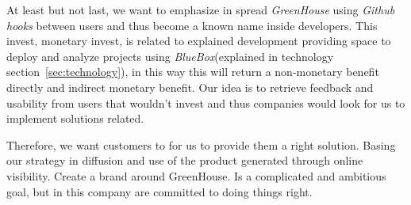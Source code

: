 \documentclass[11pt]{scrartcl}
\begin{document}
\par At least but not last, we want to emphasize in spread \emph{GreenHouse} using \emph{Github hooks} between users and thus become a known name inside developers. This invest, monetary invest, is related to explained development providing space to deploy and analyze projects using \emph{BlueBox}(explained in technology section~\ref{sec:technology}), in this way this will return a non-monetary benefit directly and indirect monetary benefit. Our idea is to retrieve feedback and usability from users that wouldn't invest and thus companies would look for us to implement solutions related.

\par Therefore, we want customers to for us to provide them a right solution. Basing our strategy in diffusion and use of the product generated through online visibility. Create a brand around GreenHouse. Is a complicated and ambitious goal, but in this company are committed to doing things right.


\end{document}
